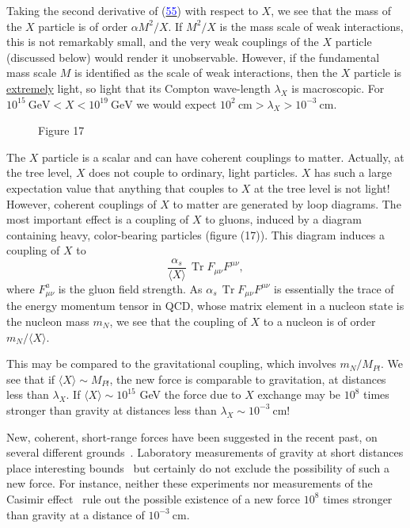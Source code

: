 \documentclass[11pt,a4paper]{article}
\newcommand{\eqnref}[1]{(\hyperlink{eq:#1}{\textcolor{blue}{#1}})}
\begin{document}
Taking the second derivative of \eqnref{55} with respect to $X$, we see
that the mass of the $X$ particle is of order $\alpha M^2/X$. If $M^2/X$ is the
mass scale of weak interactions, this is not remarkably small, and
the very weak couplings of the $X$ particle (discussed below) would
render it unobservable. However, if the fundamental mass scale $M$
is identified as the scale of weak interactions, then the $X$ particle
is \underline{extremely} light, so light that its Compton wave-length $\lambda_X$ is macroscopic.
For $10^{15}\ \mathrm{GeV} < X < 10^{19}\ \mathrm{GeV}$ we would expect $10^2\ \mathrm{cm} > \lambda_X
> 10^{-3}\ \mathrm{cm}$.

\begin{figure}
\vspace{-0.8\baselineskip}
\centering

\par\smallskip
Figure 17
\vspace{-0.6\baselineskip}
\end{figure}

The $X$ particle is a scalar and can have coherent couplings to
matter. Actually, at the tree level, $X$ does not couple to ordinary,
light particles. $X$ has such a large expectation value that anything
that couples to $X$ at the tree level is not light! However, coherent
couplings of $X$ to matter are generated by loop diagrams. The most
important effect is a coupling of $X$ to gluons, induced by a diagram
containing heavy, color-bearing particles (figure (17)). This diagram
induces a coupling of $X$ to
\[
\frac{\alpha_s}{\langle X \rangle}\, \operatorname{Tr} F_{\mu\nu} F^{\mu\nu},
\]
where $F_{\mu\nu}^a$ is the
gluon field strength. As
$\alpha_s\, \operatorname{Tr} F_{\mu\nu} F^{\mu\nu}$ is essentially the
trace of the energy momentum tensor
in QCD, whose matrix element
in a nucleon state is the nucleon
mass $m_N$, we see that the coupling
of $X$ to a nucleon is of order
$m_N/\langle X \rangle$.

This may be compared to the
gravitational coupling, which involves
$m_N/M_{Pl}$. We see that if
$\langle X \rangle \sim M_{Pl}$, the new force is comparable to gravitation, at
distances less than $\lambda_X$. If $\langle X \rangle \sim 10^{15}$
GeV the force due to $X$ exchange may be $10^8$ times stronger than
gravity at distances less than $\lambda_X \sim 10^{-3}\ \mathrm{cm}$!

New, coherent, short-range forces have been suggested in the
recent past, on several different grounds~\cite{ref21}. Laboratory measurements
of gravity at short distances place interesting bounds~\cite{ref22} but
certainly do not exclude the possibility of such a new force. For
instance, neither these experiments nor measurements of the Casimir
effect~\cite{ref23} rule out the possible existence of a new force $10^8$ times
stronger than gravity at a distance of $10^{-3}\ \mathrm{cm}$.
\end{document}
